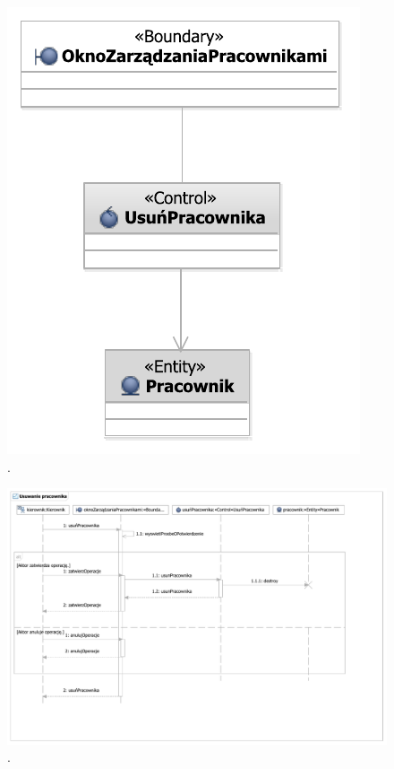\begin{figure}[H]
  \centering
  \includegraphics[angle=\ecbangle, scale=\ecbscale]{../img/usecase/pu4ecb.pdf}
  \caption{.}
\end{figure}
\begin{figure}[H]
  \centering
  \includegraphics[angle=\seqangle, scale=\seqscale]{../img/usecase/pu4seq.pdf}
  \caption{.}
\end{figure}
\newpage

